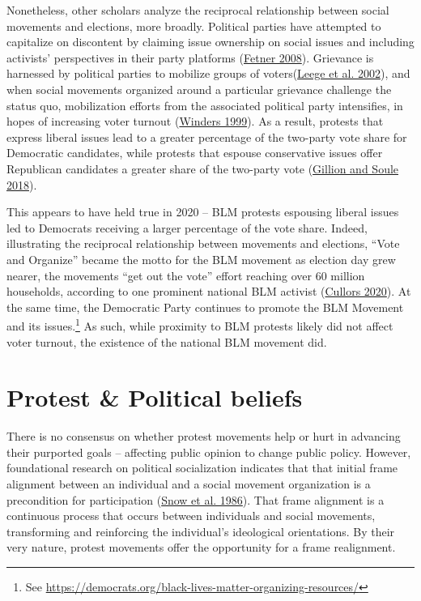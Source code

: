 \documentclass[
  12pt,
]{article}
\begin{document}
Nonetheless, other scholars analyze the reciprocal relationship between social movements and elections, more broadly. Political parties have attempted to capitalize on discontent by claiming issue ownership on social issues and including activists' perspectives in their party platforms (\protect\hyperlink{ref-Fetner2008}{Fetner 2008}). Grievance is harnessed by political parties to mobilize groups of voters(\protect\hyperlink{ref-Leege2002}{Leege et al. 2002}), and when social movements organized around a particular grievance challenge the status quo, mobilization efforts from the associated political party intensifies, in hopes of increasing voter turnout (\protect\hyperlink{ref-Winders1999}{Winders 1999}). As a result, protests that express liberal issues lead to a greater percentage of the two-party vote share for Democratic candidates, while protests that espouse conservative issues offer Republican candidates a greater share of the two-party vote (\protect\hyperlink{ref-Gillion2018}{Gillion and Soule 2018}).

This appears to have held true in 2020 -- BLM protests espousing liberal issues led to Democrats receiving a larger percentage of the vote share. Indeed, illustrating the reciprocal relationship between movements and elections, ``Vote and Organize'' became the motto for the BLM movement as election day grew nearer, the movements ``get out the vote'' effort reaching over 60 million households, according to one prominent national BLM activist (\protect\hyperlink{ref-Cullors2020}{Cullors 2020}). At the same time, the Democratic Party continues to promote the BLM Movement and its issues.\footnote{See \url{https://democrats.org/black-lives-matter-organizing-resources/}} As such, while proximity to BLM protests likely did not affect voter turnout, the existence of the national BLM movement did.

\hypertarget{protest-political-beliefs}{%
\section*{Protest \& Political beliefs}\label{protest-political-beliefs}}

There is no consensus on whether protest movements help or hurt in advancing their purported goals -- affecting public opinion to change public policy. However, foundational research on political socialization indicates that that initial frame alignment between an individual and a social movement organization is a precondition for participation (\protect\hyperlink{ref-Snow1986}{Snow et al. 1986}). That frame alignment is a continuous process that occurs between individuals and social movements, transforming and reinforcing the individual's ideological orientations. By their very nature, protest movements offer the opportunity for a frame realignment.
\end{document}
